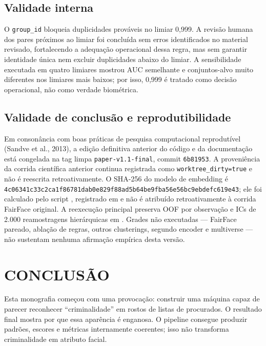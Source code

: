 \section{Validade interna}

O \texttt{group\_id} bloqueia duplicidades prováveis no limiar 0,999. A revisão humana dos pares próximos ao limiar foi concluída sem erros identificados no material revisado, fortalecendo a adequação operacional dessa regra, mas sem garantir identidade única nem excluir duplicidades abaixo do limiar. A sensibilidade executada em quatro limiares mostrou AUC semelhante e conjuntos-alvo muito diferentes nos limiares mais baixos; por isso, 0,999 é tratado como decisão operacional, não como verdade biométrica.

\section{Validade de conclusão e reprodutibilidade}

Em consonância com boas práticas de pesquisa computacional reprodutível (Sandve et al., 2013), a edição definitiva anterior do código e da documentação está congelada na tag limpa \texttt{paper-v1.1-final}, commit \texttt{6b81953}. A proveniência da corrida científica anterior continua registrada como \texttt{worktree\_dirty=true} e não é reescrita retroativamente. O SHA-256 do modelo de embedding  é \texttt{4c06341c33c2ca1f86781dab0e829f88ad5b64be9fba56e56bc9ebdefc619e43}; ele foi calculado pelo script , registrado em  e não é atribuído retroativamente à corrida FairFace original. A reexecução principal preserva OOF por observação e ICs de 2.000 reamostragens hierárquicas em . Grades não executadas --- FairFace pareado, ablação de regras, outros clusterings, segundo encoder e multiverse --- não sustentam nenhuma afirmação empírica desta versão.

\chapter{CONCLUSÃO}

Esta monografia começou com uma provocação: construir uma máquina capaz de parecer reconhecer ``criminalidade'' em rostos de listas de procurados. O resultado final mostra por que essa aparência é enganosa. O pipeline consegue produzir padrões, escores e métricas internamente coerentes; isso não transforma criminalidade em atributo facial.

